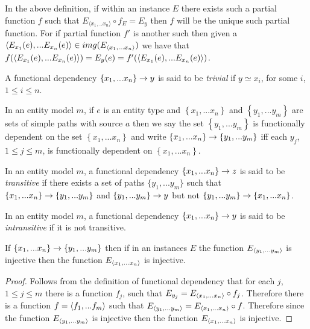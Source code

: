\documentclass[10pt,a4paper]{article}
\newcommand{\set}[1]{\left\{#1\right\}}
\newcommand{\genericmodel}{\mathcal{M}}
\renewcommand{\genericmodel}{{m}}
\newcommand{\sfd}[2]{\ensuremath{\set{#1} \morph #2}}  %
\newcommand{\fd}[2]{\ensuremath{\sfd{#1}{\set{#2}}}}
\newcommand{\term}[1]{\textit{{#1}}}
\begin{document}
\begin{remark}
In the above definition, if within an instance $E$ there exists such a partial function $f$ such that
$E_{\langle x_1,..x_n \rangle} \circ f_E = E_y$ then $f$ will be the unique such partial function. For if 
partial function $f'$ is another such then given a $\langle E_{x_1}(e),...E_{x_n}(e)\rangle \in img(E_{\langle x_1,...x_n\rangle})$
we have that $f(\langle E_{x_1}(e),...E_{x_n}(e)\rangle)=E_y(e)=f'(\langle E_{x_1}(e),...E_{x_n}(e)\rangle)$.
\end{remark}

\begin{definition}
A functional dependency \sfd{x_1,...x_n}{y} is said to be \term{trivial} if $y\simeq x_i$, for some $i$, $1 \leq i \leq n$.
\end{definition}

\begin{definition}
In an entity model $\genericmodel$, if
$e$ is an entity type and $\set{x_1,...x_n}$ and $\set{y_1,...y_m}$ are sets of simple paths with source $a$
then we say the set $\set{y_1,...y_m}$ is functionally dependent on the set $\set{x_1,...x_n}$ and write
\fd{x_1,...x_n}{y_1,...y_m} 
iff  each $y_j$, $1 \leq j \leq m$, is functionally dependent on $\set{x_1,...x_n}$.
\end{definition}
\begin{definition} %
In an entity model $\genericmodel$, a functional dependency $\set{x_1,...x_n} \morph z$
is said to be \term{transitive} if there exists a set of paths $\{y_1,...y_{m}\}$ such that
$\set{x_1,...x_n} \morph \set{y_1,...y_{m}}$ and $\set{y_1,...y_{m}} \morph y$ but not
$\{y_1,...y_{m}\} \rightarrow \{x_1,...x_n\}$.
\end{definition}
\begin{definition} %
In an entity model $\genericmodel$, a functional dependency $\set{x_1,...x_n} \morph y$
is said to be \term{intransitive} if it is not transitive.
\end{definition}
\begin{lemma}
\label{transitiveinjectivelemma}
If $\set{x_1,...x_n} \morph \set{y_1,...y_{m}}$ then if in an instances $E$ the function $E_{\langle y_1,...y_{m}\rangle}$ is 
injective then the function $E_{\langle x_1,...x_n\rangle}$  is injective.
\end{lemma}
\begin{proof}
Follows from the definition of functional dependency that for each $j$, $1 \leq j \leq m$  there is a function ${f_j}$,  such that
$E_{y_j}=E_{\langle x_1,...x_n\rangle}\circ f_j$. Therefore there is a function $f=\langle f_1,...f_m\rangle$ such that
$E_{\langle y_1,...y_m\rangle}= E_{\langle x_1,...x_n\rangle}\circ f $. Therefore since  the function $E_{\langle y_1,...y_{m}\rangle}$ is 
injective then the function $E_{\langle x_1,...x_n\rangle}$  is injective.
\end{proof}
\end{document}
